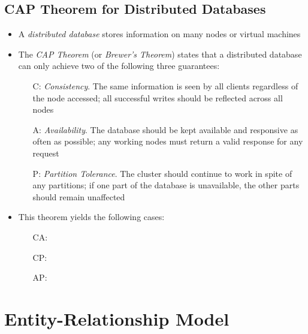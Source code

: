 \documentclass[a4paper]{article}
\begin{document}
\subsection{CAP Theorem for Distributed Databases}
\begin{itemize}
    \item A \emph{distributed database} stores information on many nodes or virtual machines
    \item The \emph{CAP Theorem} (or \emph{Brewer's Theorem}) states that a distributed database can only achieve two of the following three guarantees:
    \begin{itemize}
        \item[C:] \emph{Consistency}. The same information is seen by all clients regardless of the node accessed; all successful writes should be reflected across all nodes
        \item[A:] \emph{Availability}. The database should be kept available and responsive as often as possible; any working nodes must return a valid response for any request
        \item[P:] \emph{Partition Tolerance}. The cluster should continue to work in spite of any partitions; if one part of the database is unavailable, the other parts should remain unaffected
    \end{itemize}
    \item This theorem yields the following cases:
    \begin{itemize}
        \item[CA:]
        \item[CP:]
        \item[AP:]
    \end{itemize}
\end{itemize}

\section{Entity-Relationship Model}
\end{document}
